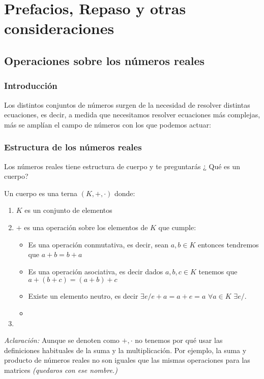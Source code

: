 \part{Prefacios, Repaso y otras consideraciones}



\chapter{Operaciones sobre los números reales}

\minitoc

 
\section*{Introducción} 

Los distintos conjuntos de números surgen de la necesidad de resolver distintas ecuaciones, es decir, a medida que necesitamos resolver ecuaciones más complejas, más se amplían el campo de números con los que podemos actuar:
 
\section{Estructura de los números reales}
Los números reales tiene estructura de cuerpo y te preguntarás ¿ Qué es un cuerpo?
\begin{defi}
Un cuerpo es una terna $(K,+,\cdot)$ donde:
\begin{enumerate}
\item $K$ es un conjunto de elementos 
\item $+$ es una operación sobre los elementos de $K$ que cumple:
\begin{itemize}
\item Es una operación conmutativa, es decir, sean $a,b\in K$ entonces tendremos que $a+b=b+a$
\item Es una operación asociativa, es decir dados $a,b,c \in K$ tenemos que $a+(b+c)=(a+b)+c$
\item Existe un elemento neutro, es decir $\exists e / e+a=a+e=a$ $\forall a \in K$ $\exists e /$.
\item
\end{itemize}


\item
\end{enumerate}

\emph{Aclaración: } Aunque se denoten como $+, \cdot$ no tenemos por qué usar las definiciones habituales de la suma y la multiplicación. Por ejemplo, la suma y producto de números reales no son iguales que las mismas operaciones para las matrices \emph{(quedaros con ese nombre.) } 
\end{defi}



